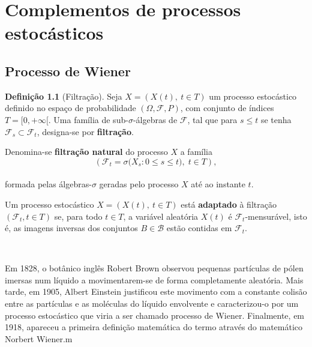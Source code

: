 \documentclass[
  11pt,
  a4paper,
]{book}
\theoremstyle{definition}
\newtheorem{definition}{Definição}[chapter]
\theoremstyle{definition}
\theoremstyle{definition}
\theoremstyle{definition}
\theoremstyle{remark}
\begin{document}
\chapter{Complementos de processos estocásticos}\label{complementos-de-processos-estocuxe1sticos}

\section{Processo de Wiener}\label{processo-de-wiener}

\begin{definition}[Filtração]
Seja \(X = (X(t), ~ t \in T)\) um processo estocástico definido no espaço de probabilidade \((\Omega, \mathcal{F}, P)\), com conjunto de índices \(T = [0, +\infty[\). Uma família de sub-\(\sigma\)-álgebras de \(\mathcal{F}\), tal que para \(s \leq t\) se tenha \(\mathcal{F}_s \subset \mathcal{F}_t\), designa-se por \textbf{filtração}.

Denomina-se \textbf{filtração natural} do processo \(X\) a família\\
\[
\left(\mathcal{F}_t = \sigma\big(X_s : 0 \leq s \leq t\big), \; t \in T\right),
\]\\
formada pelas álgebras-\(\sigma\) geradas pelo processo \(X\) até ao instante \(t\).

Um processo estocástico \(X = (X(t), ~ t \in T)\) está \textbf{adaptado} à filtração \((\mathcal{F}_t, t \in T)\) se, para todo \(t \in T\), a variável aleatória \(X(t)\) é \(\mathcal{F}_t\)-mensurável, isto é, as imagens inversas dos conjuntos \(B \in \mathcal{B}\) estão contidas em \(\mathcal{F}_t\).
\end{definition}

\(\,\)

Em 1828, o botânico inglês Robert Brown observou pequenas partículas de pólen imersas num líquido a movimentarem-se de forma completamente aleatória. Mais tarde, em 1905, Albert Einstein justificou este movimento com a constante colisão entre as partículas e as moléculas do líquido envolvente e caracterizou-o por um processo estocástico que viria a ser chamado processo de Wiener. Finalmente, em 1918, apareceu a primeira definição matemática do termo através do matemático Norbert Wiener.m

\(\,\)
\end{document}
